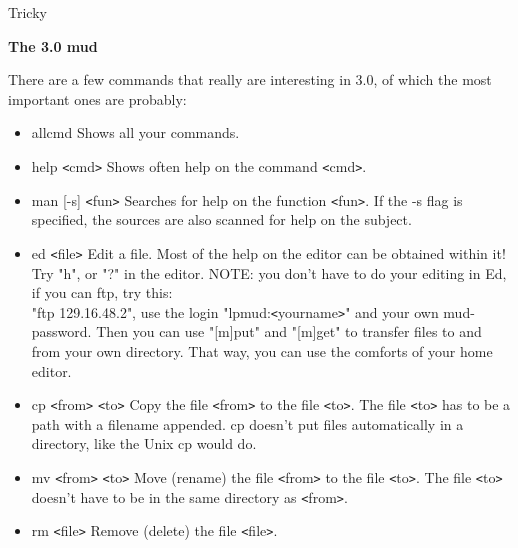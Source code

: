                                                    Tricky

{\bf The 3.0 mud}

There are a few commands that really are interesting in 3.0, of which the
most important ones are probably:

\begin{itemize}
\item allcmd          Shows all your commands.

\item help \verb+<+cmd\verb+>+ Shows often help on the command
                    \verb+<+cmd\verb+>+.

\item man [-s] \verb+<+fun\verb+>+ Searches for help on the function
                    \verb+<+fun\verb+>+.  If the
                   -s flag is specified, the sources are also scanned
                   for help on the subject.

\item ed \verb+<+file\verb+>+ Edit a file.  Most of the help on the editor can be
                   obtained within it! Try "h", or "?" in the editor.
                   NOTE: you don't have to do your editing in Ed, if
                   you can ftp, try this: \\ "ftp 129.16.48.2", use the
                   login "lpmud:\verb+<+yourname\verb+>+" and your own mud-password.
                   Then you can use "[m]put" and "[m]get" to transfer
                   files to and from your own directory. That way, you
                   can use the comforts of your home editor.

\item cp \verb+<+from\verb+>+ \verb+<+to\verb+>+ Copy the file
                \verb+<+from\verb+>+ to the file \verb+<+to\verb+>+.  The file
                \verb+<+to\verb+>+
                   has to be a path with a filename appended. cp doesn't
                   put files automatically in a directory, like the Unix
                   cp would do.

\item mv \verb+<+from\verb+>+ \verb+<+to\verb+>+ Move (rename) the file
                \verb+<+from\verb+>+ to the file \verb+<+to\verb+>+.  The
                   file \verb+<+to\verb+>+ doesn't have to be in the same directory
                   as \verb+<+from\verb+>+.

\item rm \verb+<+file\verb+>+       Remove (delete) the file \verb+<+file\verb+>+.


\end{itemize}
